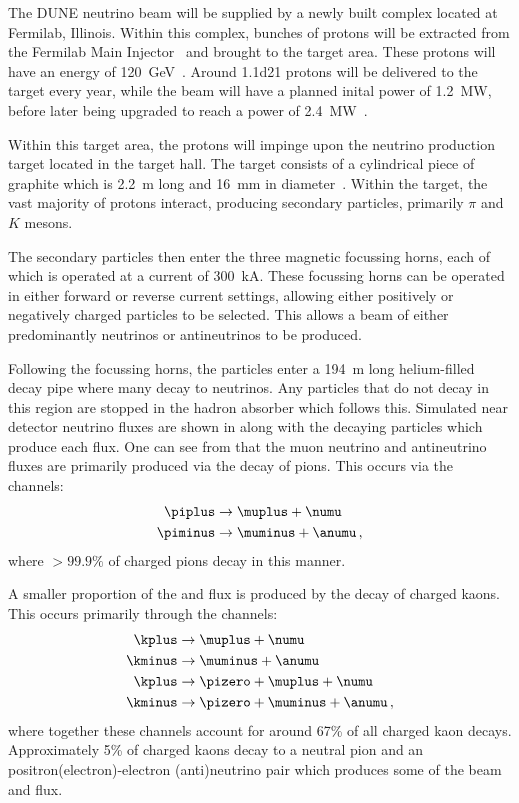 The DUNE neutrino beam will be supplied by a newly built complex located at Fermilab, Illinois.
Within this complex, bunches of protons will be extracted from the Fermilab Main Injector~\cite{mainInjector} and brought to the target area.
These protons will have an energy of \SI{120}{\giga\electronvolt}~\cite{duneBeam}.
Around \num{1.1d21} protons will be delivered to the target every year, while the beam will have a planned inital power of \SI{1.2}{\mega\watt}, before later being upgraded to reach a power of \SI{2.4}{\mega\watt}~\cite{duneBeam}.

Within this target area, the protons will impinge upon the neutrino production target located in the target hall.
The target consists of a cylindrical piece of graphite which is \SI{2.2}{\metre} long and \SI{16}{\milli\metre} in diameter~\cite{duneBeam}.
Within the target, the vast majority of protons interact, producing secondary particles, primarily $\pi$ and $K$ mesons.

The secondary particles then enter the three magnetic focussing horns, each of which is operated at a current of \SI{300}{\kilo\ampere}.
These focussing horns can be operated in either forward or reverse current settings, allowing either positively or negatively charged particles to be selected.
This allows a beam of either predominantly neutrinos or antineutrinos to be produced.

Following the focussing horns, the particles enter a \SI{194}{\metre} long helium-filled decay pipe where many decay to neutrinos.
Any particles that do not decay in this region are stopped in the hadron absorber which follows this.
Simulated near detector neutrino fluxes are shown in  along with the decaying particles which produce each flux.
One can see from  that the muon neutrino and antineutrino fluxes are primarily produced via the decay of pions.
This occurs via the channels:
\begin{align}
  \piplus &\rightarrow \muplus + \numu \\
  \piminus &\rightarrow \muminus + \anumu \, ,
\end{align}
where $>99.9\%$ of charged pions decay in this manner.

A smaller proportion of the \numu and \anumu flux is produced by the decay of charged kaons.
This occurs primarily through the channels:
\begin{align}
  \kplus &\rightarrow \muplus + \numu \\
  \kminus &\rightarrow \muminus + \anumu \\
  \kplus &\rightarrow \pizero + \muplus + \numu \\
  \kminus &\rightarrow \pizero + \muminus + \anumu \, ,
\end{align}
where together these channels account for around 67\% of all charged kaon decays.
Approximately 5\% of charged kaons decay to a neutral pion and an positron(electron)-electron (anti)neutrino pair which produces some of the beam \nue and \anue flux.


